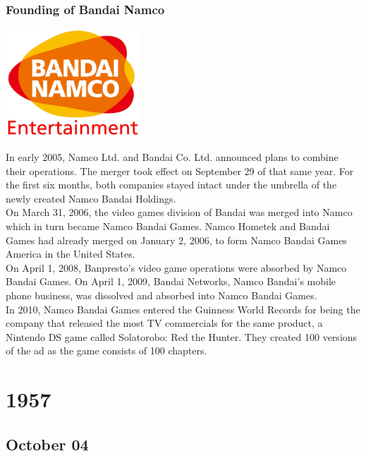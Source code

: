 \documentclass[11pt]{report}
\begin{document}
\subsection{Founding of Bandai Namco}
\vspace{2mm}\begin{center}\includegraphics[width=5cm]{./img/bandaiNamcoLogo.jpg}\end{center}
In early 2005, Namco Ltd. and Bandai Co. Ltd. announced plans to combine their operations. The merger took effect on September 29 of that same year. For the first six months, both companies stayed intact under the umbrella of the newly created Namco Bandai Holdings.\\
\indent On March 31, 2006, the video games division of Bandai was merged into Namco which in turn became Namco Bandai Games. Namco Hometek and Bandai Games had already merged on January 2, 2006, to form Namco Bandai Games America in the United States.\\
\indent On April 1, 2008, Banpresto's video game operations were absorbed by Namco Bandai Games. On April 1, 2009, Bandai Networks, Namco Bandai's mobile phone business, was dissolved and absorbed into Namco Bandai Games.\\
\indent In 2010, Namco Bandai Games entered the Guinness World Records for being the company that released the most TV commercials for the same product, a Nintendo DS game called Solatorobo: Red the Hunter. They created 100 versions of the ad as the game consists of 100 chapters.

\chapter{1957}
\section{October 04}
\end{document}

